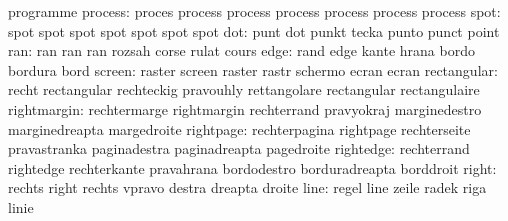                            programme
                  process: proces                    process
                           process                   process
                           process                   process
                           process
                     spot: spot                      spot
                           spot                      spot
                           spot                      spot
                           spot
                      dot: punt                      dot
                           punkt                     tecka
                           punto                     punct
                           point
                      ran: ran                       ran
                           ran                       rozsah
                           corse                     rulat
                           cours
                     edge: rand                      edge
                           kante                     hrana
                           bordo                     bordura
                           bord
                   screen: raster                    screen
                           raster                    rastr
                           schermo                   ecran
                           ecran
              rectangular: recht                     rectangular
                           rechteckig                pravouhly
                           rettangolare              rectangular
                           rectangulaire
              rightmargin: rechtermarge              rightmargin
                           rechterrand               pravyokraj
                           marginedestro             marginedreapta
                           margedroite
                rightpage: rechterpagina             rightpage
                           rechterseite              pravastranka
                           paginadestra              paginadreapta
                           pagedroite
                rightedge: rechterrand               rightedge
                           rechterkante              pravahrana
                           bordodestro               borduradreapta
                           borddroit
                    right: rechts                    right
                           rechts                    vpravo
                           destra                    dreapta
                           droite
                     line: regel                     line
                           zeile                     radek
                           riga                      linie
